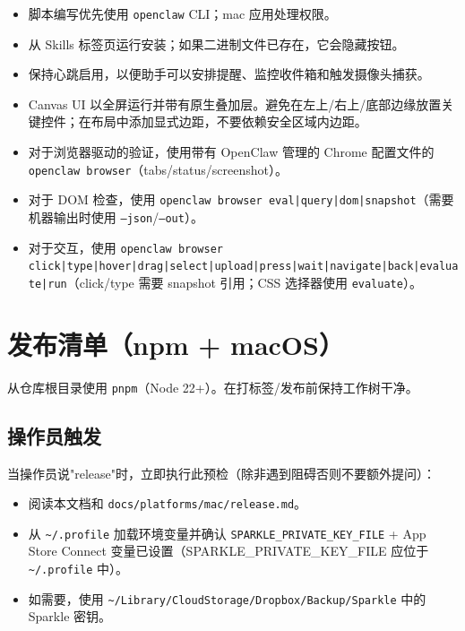 \begin{itemize}
  \item 脚本编写优先使用 \texttt{openclaw} CLI；mac 应用处理权限。
  \item 从 Skills 标签页运行安装；如果二进制文件已存在，它会隐藏按钮。
  \item 保持心跳启用，以便助手可以安排提醒、监控收件箱和触发摄像头捕获。
  \item Canvas UI 以全屏运行并带有原生叠加层。避免在左上/右上/底部边缘放置关键控件；在布局中添加显式边距，不要依赖安全区域内边距。
  \item 对于浏览器驱动的验证，使用带有 OpenClaw 管理的 Chrome 配置文件的 \texttt{openclaw browser}（tabs/status/screenshot）。
  \item 对于 DOM 检查，使用 \texttt{openclaw browser eval|query|dom|snapshot}（需要机器输出时使用 \texttt{--json}/\texttt{--out}）。
  \item 对于交互，使用 \texttt{openclaw browser click|type|hover|drag|select|upload|press|wait|navigate|back|evaluate|run}（click/type 需要 snapshot 引用；CSS 选择器使用 \texttt{evaluate}）。
\end{itemize}



\clearpage

\section{发布清单（npm + macOS）}


从仓库根目录使用 \texttt{pnpm}（Node 22+）。在打标签/发布前保持工作树干净。

\subsection{操作员触发}


当操作员说"release"时，立即执行此预检（除非遇到阻碍否则不要额外提问）：

\begin{itemize}
  \item 阅读本文档和 \texttt{docs/platforms/mac/release.md}。
  \item 从 \texttt{\textasciitilde{}/.profile} 加载环境变量并确认 \texttt{SPARKLE\_PRIVATE\_KEY\_FILE} + App Store Connect 变量已设置（SPARKLE\_PRIVATE\_KEY\_FILE 应位于 \texttt{\textasciitilde{}/.profile} 中）。
  \item 如需要，使用 \texttt{\textasciitilde{}/Library/CloudStorage/Dropbox/Backup/Sparkle} 中的 Sparkle 密钥。
\end{itemize}


